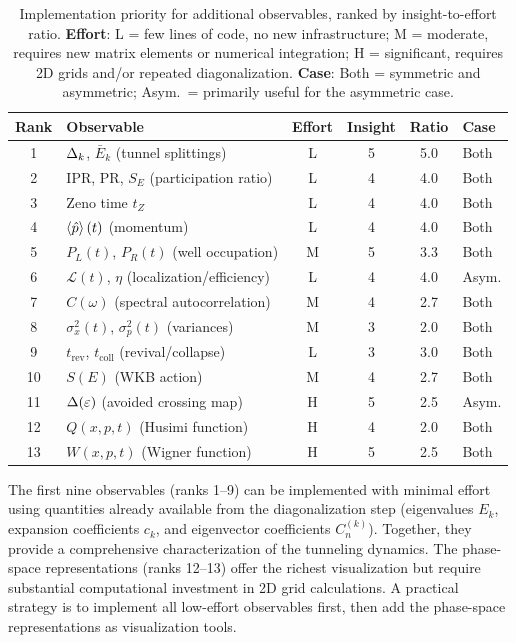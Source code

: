 \begin{table}[H]
\centering
\renewcommand{\arraystretch}{1.4}
\begin{tabular}{clcccl}
  \toprule
  \textbf{Rank} & \textbf{Observable} & \textbf{Effort} & \textbf{Insight} & \textbf{Ratio} & \textbf{Case}\\
  \midrule
  1 & $\Delta_k$, $\bar{E}_k$ (tunnel splittings) & L & 5 & 5.0 & Both\\
  2 & IPR, PR, $S_E$ (participation ratio) & L & 4 & 4.0 & Both\\
  3 & Zeno time $t_Z$ & L & 4 & 4.0 & Both\\
  4 & $\expval{\hat{p}}(t)$ (momentum) & L & 4 & 4.0 & Both\\
  5 & $P_L(t)$, $P_R(t)$ (well occupation) & M & 5 & 3.3 & Both\\
  6 & $\mathcal{L}(t)$, $\eta$ (localization/efficiency) & L & 4 & 4.0 & Asym.\\
  7 & $C(\omega)$ (spectral autocorrelation) & M & 4 & 2.7 & Both\\
  8 & $\sigma_x^2(t)$, $\sigma_p^2(t)$ (variances) & M & 3 & 2.0 & Both\\
  9 & $t_{\text{rev}}$, $t_{\text{coll}}$ (revival/collapse) & L & 3 & 3.0 & Both\\
  10 & $S(E)$ (WKB action) & M & 4 & 2.7 & Both\\
  11 & $\Delta(\varepsilon)$ (avoided crossing map) & H & 5 & 2.5 & Asym.\\
  12 & $Q(x,p,t)$ (Husimi function) & H & 4 & 2.0 & Both\\
  13 & $W(x,p,t)$ (Wigner function) & H & 5 & 2.5 & Both\\
  \bottomrule
\end{tabular}
\caption{Implementation priority for additional observables, ranked by insight-to-effort ratio.
\textbf{Effort}: L = few lines of code, no new infrastructure; M = moderate, requires new matrix elements or numerical integration; H = significant, requires 2D grids and/or repeated diagonalization.
\textbf{Case}: Both = symmetric and asymmetric; Asym.\ = primarily useful for the asymmetric case.}
\label{tab:priority}
\end{table}

\begin{remark}
The first nine observables (ranks 1--9) can be implemented with minimal effort using quantities already available from the diagonalization step (eigenvalues $E_k$, expansion coefficients $c_k$, and eigenvector coefficients $C_n^{(k)}$).
Together, they provide a comprehensive characterization of the tunneling dynamics.
The phase-space representations (ranks 12--13) offer the richest visualization but require substantial computational investment in 2D grid calculations.
A practical strategy is to implement all low-effort observables first, then add the phase-space representations as visualization tools.
\end{remark}

